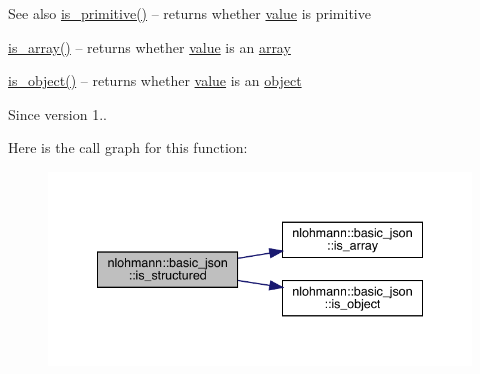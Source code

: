 \begin{DoxySeeAlso}{See also}
\mbox{\hyperlink{classnlohmann_1_1basic__json_a6362b88718eb5c6d4fed6a61eed44b95}{is\+\_\+primitive()}} -- returns whether \mbox{\hyperlink{classnlohmann_1_1basic__json_af9c51328fbe1da75eca750be3009917a}{value}} is primitive 

\mbox{\hyperlink{classnlohmann_1_1basic__json_aef9ce5dd2381caee1f8ddcdb5bdd9c65}{is\+\_\+array()}} -- returns whether \mbox{\hyperlink{classnlohmann_1_1basic__json_af9c51328fbe1da75eca750be3009917a}{value}} is an \mbox{\hyperlink{classnlohmann_1_1basic__json_a4a4ec75e4d2845d9bcf7a9e5458e4949}{array}} 

\mbox{\hyperlink{classnlohmann_1_1basic__json_af8f511af124e82e4579f444b4175787c}{is\+\_\+object()}} -- returns whether \mbox{\hyperlink{classnlohmann_1_1basic__json_af9c51328fbe1da75eca750be3009917a}{value}} is an \mbox{\hyperlink{classnlohmann_1_1basic__json_a9f42ee7d10eee2d5a73fd94ca7f767ca}{object}}
\end{DoxySeeAlso}
\begin{DoxySince}{Since}
version 1.. 
\end{DoxySince}
Here is the call graph for this function\+:\nopagebreak
\begin{figure}[H]
\begin{center}
\leavevmode
\includegraphics[width=341pt]{classnlohmann_1_1basic__json_a9f68a0af820c3ced7f9d17851ce4c22d_cgraph}
\end{center}
\end{figure}
\mbox{\label{classnlohmann_1_1basic__json_aea8c06bb8e632f14cd77632519213d75}} 
